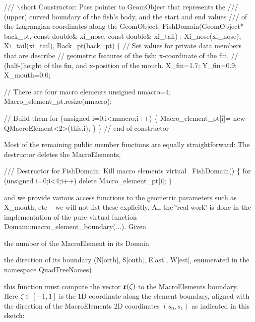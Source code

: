  
\begin{DoxyCodeInclude}
 \textcolor{comment}{/// \(\backslash\)short Constructor: Pass pointer to GeomObject that represents the}
\textcolor{comment}{ /// (upper) curved boundary of the fish's body, and the start and end values}
\textcolor{comment}{}\textcolor{comment}{ /// of the Lagrangian coordinates along the GeomObject. }
\textcolor{comment}{} FishDomain(GeomObject* back\_pt, 
            \textcolor{keyword}{const} \textcolor{keywordtype}{double}& xi\_nose,  
            \textcolor{keyword}{const} \textcolor{keywordtype}{double}& xi\_tail) :  
  Xi\_nose(xi\_nose),  Xi\_tail(xi\_tail), Back\_pt(back\_pt)
  \{
   \textcolor{comment}{// Set values for private data members that are describe}
   \textcolor{comment}{// geometric features of the fish: x-coordinate of the fin,}
   \textcolor{comment}{// (half-)height of the fin, and x-position of the mouth.}
   X\_fin=1.7;
   Y\_fin=0.9;
   X\_mouth=0.0;

   \textcolor{comment}{// There are four macro elements}
   \textcolor{keywordtype}{unsigned} nmacro=4;
   Macro\_element\_pt.resize(nmacro); 

   \textcolor{comment}{// Build them}
   \textcolor{keywordflow}{for} (\textcolor{keywordtype}{unsigned} i=0;i<nmacro;i++)
    \{
     Macro\_element\_pt[i]= \textcolor{keyword}{new} QMacroElement<2>(\textcolor{keyword}{this},i);
    \}
  \} \textcolor{comment}{// end of constructor}

\end{DoxyCodeInclude}


Most of the remaining public member functions are equally straightforward\+: The destructor deletes the {\ttfamily Macro\+Elements},

 
\begin{DoxyCodeInclude}
 \textcolor{comment}{/// Destructor for FishDomain: Kill macro elements}
 \textcolor{keyword}{virtual} ~FishDomain()
 \{
  \textcolor{keywordflow}{for} (\textcolor{keywordtype}{unsigned} i=0;i<4;i++) \textcolor{keyword}{delete} Macro\_element\_pt[i];
 \} 

\end{DoxyCodeInclude}


and we provide various access functions to the geometric parameters such as {\ttfamily X\+\_\+mouth}, etc -- we will not list these explicitly. All the \char`\"{}real work\char`\"{} is done in the implementation of the pure virtual function {\ttfamily Domain\+::macro\+\_\+element\+\_\+boundary}(...). Given
\begin{DoxyItemize}
\item the number of the {\ttfamily Macro\+Element} in its {\ttfamily Domain} 
\item the direction of its boundary (N\mbox{[}orth\mbox{]}, S\mbox{[}outh\mbox{]}, E\mbox{[}ast\mbox{]}, W\mbox{[}est\mbox{]}, enumerated in the namespace {\ttfamily Quad\+Tree\+Names})
\end{DoxyItemize}this function must compute the vector $ {\bf r}(\zeta)$ to the {\ttfamily Macro\+Element\textquotesingle{}s} boundary. Here $ \zeta \in [-1,1]$ is the 1D coordinate along the element boundary, aligned with the direction of the {\ttfamily Macro\+Element\textquotesingle{}s} 2D coordinates $(s_0,s_1) $ as indicated in this sketch\+:

